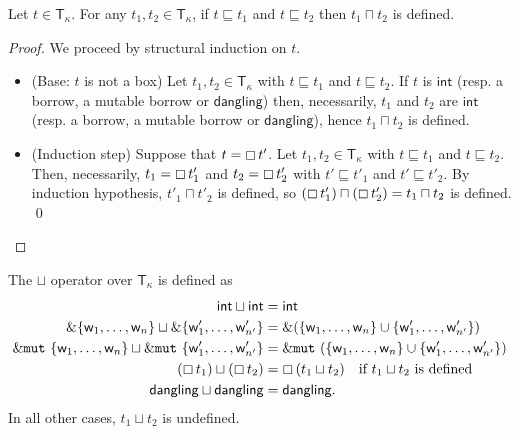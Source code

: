 \begin{lemma}\label{lemma:technical-type}
  Let $t\in\mathsf{T}_\kappa$. For any $t_1,t_2\in\mathsf{T}_\kappa$,
  if $t\sqsubseteq t_1$ and $t\sqsubseteq t_2$ then $t_1\sqcap t_2$ is defined.
\end{lemma}
\begin{proof}
  We proceed by structural induction on $t$.
  \begin{itemize}
    \item (Base: $t$ is not a box)
    Let $t_1,t_2\in\mathsf{T}_\kappa$ with $t\sqsubseteq t_1$ and $t\sqsubseteq t_2$.
    If $t$ is $\mathsf{int}$ (resp. a borrow, a mutable borrow or $\mathsf{dangling}$)
    then, necessarily, $t_1$ and $t_2$ are $\mathsf{int}$ (resp. a borrow,
    a mutable borrow or $\mathsf{dangling}$), hence $t_1\sqcap t_2$ is defined.
    \item (Induction step) Suppose that $t = \boxempty\,{t'}$.
    Let $t_1,t_2\in\mathsf{T}_\kappa$ with $t\sqsubseteq t_1$ and $t\sqsubseteq t_2$.
    Then, necessarily, $t_1 = \boxempty\,{t'_1}$ and $t_2 = \boxempty\,{t'_2}$
    with $t'\sqsubseteq t'_1$ and $t'\sqsubseteq t'_2$. By induction
    hypothesis, $t'_1\sqcap t'_2$ is defined, so
    $(\boxempty\,{t'_1}) \sqcap (\boxempty\,{t'_2}) = t_1 \sqcap t_2$ is defined.
    \qed
  \end{itemize}
\end{proof}

\begin{definition}
  The $\sqcup$ operator over $\mathsf{T}_\kappa$ is defined as
  \begin{align*}
    \mathsf{int}\sqcup\mathsf{int} &= \mathsf{int}\\
    \&\{\mathsf{w}_1,\ldots,\mathsf{w}_n\} \sqcup \&\{\mathsf{w}'_1,\ldots,\mathsf{w}'_{n'}\} &= \&(\{\mathsf{w}_1,\ldots,\mathsf{w}_n\}\cup\{\mathsf{w}'_1,\ldots,\mathsf{w}'_{n'}\})\\
    \&\mathtt{mut}\ \{\mathsf{w}_1,\ldots,\mathsf{w}_n\} \sqcup \&\mathtt{mut}\ \{\mathsf{w}'_1,\ldots,\mathsf{w}'_{n'}\} &= \&\mathtt{mut}\ (\{\mathsf{w}_1,\ldots,\mathsf{w}_n\}\cup\{\mathsf{w}'_1,\ldots,\mathsf{w}'_{n'}\})\\
    (\boxempty\,{t_1}) \sqcup (\boxempty\,{t_2}) &=\boxempty\,{(t_1\sqcup t_2)}\quad\text{if $t_1\sqcup t_2$ is defined}\\
    \mathsf{dangling}\sqcup\mathsf{dangling} &= \mathsf{dangling}.
  \end{align*}
  In all other cases, $t_1\sqcup t_2$ is undefined.
\end{definition}

